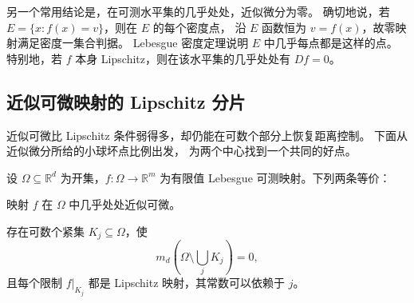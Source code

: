 \ProseParagraphBreak

另一个常用结论是，在可测水平集的几乎处处，近似微分为零。
确切地说，若 \(E=\{x:f(x)=v\}\)，则在 \(E\) 的每个密度点，
沿 \(E\) 函数恒为 \(v=f(x)\)，故零映射满足密度一集合判据。
Lebesgue 密度定理说明 \(E\) 中几乎每点都是这样的点。
特别地，若 \(f\) 本身 Lipschitz，则在该水平集的几乎处处有 \(Df=0\)。

\subsection{近似可微映射的 Lipschitz 分片}
\label{b1:subsec:160303}

近似可微比 Lipschitz 条件弱得多，却仍能在可数个部分上恢复距离控制。
下面从近似微分所给的小球坏点比例出发，
为两个中心找到一个共同的好点。

\begin{theorem}\label{b1:thm:approximate-lipschitz-pieces}
设 \(\Omega\subseteq\mathbb R^d\) 为开集，\(f:\Omega\rightarrow\mathbb R^m\)
为有限值 Lebesgue 可测映射。下列两条等价：
\begin{equivalences}
\item\label{b1:item:approximate-pieces-ae}映射 \(f\) 在 \(\Omega\) 中几乎处处近似可微。
\item\label{b1:item:approximate-pieces-compact}存在可数个紧集 \(K_j\subseteq\Omega\)，使
\[
 m_d\left(\Omega\setminus\bigcup_jK_j\right)=0,
\]
且每个限制 \(f|_{K_j}\) 都是 Lipschitz 映射，其常数可以依赖于 \(j\)。
\end{equivalences}
\end{theorem}
